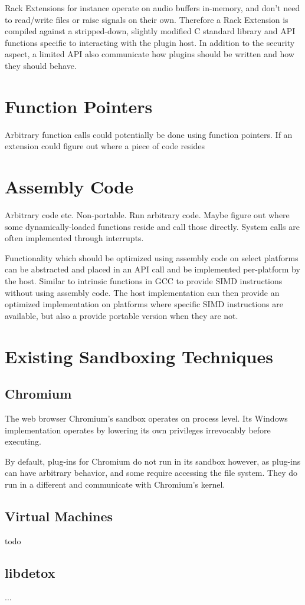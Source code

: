 Rack Extensions for instance operate on audio buffers in-memory, and don't need
to read/write files or raise signals on their own. Therefore a Rack Extension is
compiled against a stripped-down, slightly modified C standard library and API
functions specific to interacting with the plugin host. In addition to the
security aspect, a limited API also communicate how plugins should be written
and how they should behave.

\section {Function Pointers}

Arbitrary function calls could potentially be done using function pointers. If
an extension could figure out where a piece of code resides

\section {Assembly Code}

Arbitrary code etc. Non-portable. Run arbitrary code. Maybe figure out where
some dynamically-loaded functions reside and call those directly. System calls
are often implemented through interrupts. 

Functionality which should be optimized using assembly code on select platforms
can be abstracted and placed in an API call and be implemented per-platform by
the host. Similar to intrinsic functions in GCC to provide SIMD instructions
without using assembly code. The host implementation can then provide an
optimized implementation on platforms where specific SIMD instructions are
available, but also a provide portable version when they are not.

\section {Existing Sandboxing Techniques}

\subsection {Chromium}

The web browser Chromium's sandbox operates on process level. Its Windows
implementation operates by lowering its own privileges irrevocably before
executing.

By default, plug-ins for Chromium do not run in its sandbox however, as
plug-ins can have arbitrary behavior, and some require accessing the file
system. They do run in a different and communicate with Chromium's kernel.

\subsection {Virtual Machines}

todo

\subsection {libdetox}

...

